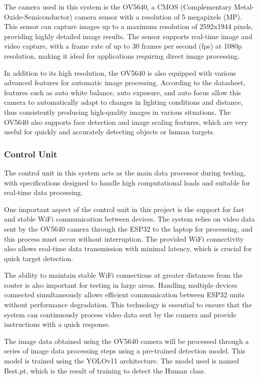 The camera used in this system is the OV5640, a CMOS (Complementary Metal-Oxide-Semiconductor) camera sensor with a resolution of 5 megapixels (MP). This sensor can capture images up to a maximum resolution of 2592x1944 pixels, providing highly detailed image results. The sensor supports real-time image and video capture, with a frame rate of up to 30 frames per second (fps) at 1080p resolution, making it ideal for applications requiring direct image processing.

In addition to its high resolution, the OV5640 is also equipped with various advanced features for automatic image processing. According to the datasheet, features such as auto white balance, auto exposure, and auto focus allow this camera to automatically adapt to changes in lighting conditions and distance, thus consistently producing high-quality images in various situations. The OV5640 also supports face detection and image scaling features, which are very useful for quickly and accurately detecting objects or human targets.

\vspace{5pt}
\subsubsection{Control Unit}
\label{subsubsec:controlunit}

The control unit in this system acts as the main data processor during testing, with specifications designed to handle high computational loads and suitable for real-time data processing.

One important aspect of the control unit in this project is the support for fast and stable WiFi communication between devices. The system relies on video data sent by the OV5640 camera through the ESP32 to the laptop for processing, and this process must occur without interruption. The provided WiFi connectivity also allows real-time data transmission with minimal latency, which is crucial for quick target detection.

The ability to maintain stable WiFi connections at greater distances from the router is also important for testing in large areas. Handling multiple devices connected simultaneously allows efficient communication between ESP32 units without performance degradation. This technology is essential to ensure that the system can continuously process video data sent by the camera and provide instructions with a quick response.

The image data obtained using the OV5640 camera will be processed through a series of image data processing steps using a pre-trained detection model. This model is trained using the YOLOv11 architecture. The model used is named Best.pt, which is the result of training to detect the Human class.

